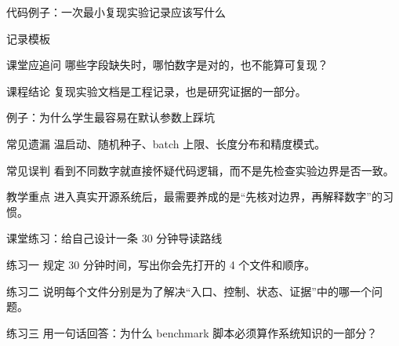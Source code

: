 \begin{frame}{代码例子：一次最小复现实验记录应该写什么}
  \begin{block}{记录模板}
    {\ttfamily\small
    \par
    \par
    \par
    }
  \end{block}
  \pause
  \begin{block}{课堂应追问}
    哪些字段缺失时，哪怕数字是对的，也不能算可复现？
  \end{block}
  \pause
  \begin{block}{课程结论}
    复现实验文档是工程记录，也是研究证据的一部分。
  \end{block}
\end{frame}

\begin{frame}{例子：为什么学生最容易在默认参数上踩坑}
  \begin{block}{常见遗漏}
    温启动、随机种子、batch 上限、长度分布和精度模式。
  \end{block}
  \pause
  \begin{block}{常见误判}
    看到不同数字就直接怀疑代码逻辑，而不是先检查实验边界是否一致。
  \end{block}
  \pause
  \begin{block}{教学重点}
    进入真实开源系统后，最需要养成的是“先核对边界，再解释数字”的习惯。
  \end{block}
\end{frame}

\begin{frame}{课堂练习：给自己设计一条 30 分钟导读路线}
  \begin{block}{练习一}
    规定 30 分钟时间，写出你会先打开的 4 个文件和顺序。
  \end{block}
  \pause
  \begin{block}{练习二}
    说明每个文件分别是为了解决“入口、控制、状态、证据”中的哪一个问题。
  \end{block}
  \pause
  \begin{block}{练习三}
    用一句话回答：为什么 benchmark 脚本必须算作系统知识的一部分？
  \end{block}
\end{frame}
